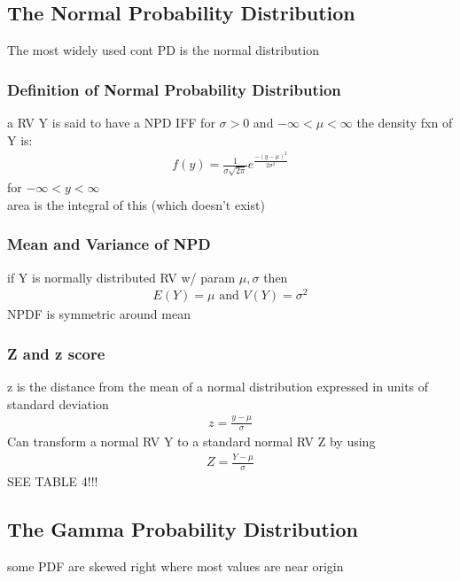\documentclass[12pt]{article}
\begin{document}
\subsection{The Normal Probability Distribution}
    The most widely used cont PD is the normal distribution
    \subsubsection{Definition of Normal Probability Distribution}
        a RV Y is said to have a NPD IFF for $ \sigma >0 $ and
        $ -\infty < \mu < \infty  $ the density fxn of Y is:
        \begin{align*}
            f(y) = \frac{1}{\sigma \sqrt{2\pi } }
            e^{\frac{-(y-\mu)^2}{2\sigma ^2 }}
        \end{align*}
        for $ -\infty < y < \infty  $\\
        area is the integral of this (which doesn't exist)
    \subsubsection{Mean and Variance of NPD}
        if Y is normally distributed RV w/ param $ \mu, \sigma  $ then
        \begin{align*}
            E(Y) = \mu \text{ and } V(Y) = \sigma ^2 
        \end{align*}
        NPDF is symmetric around mean
    \subsubsection{Z and z score}
        z is the distance from the mean of a normal distribution
        expressed in units of standard deviation
        \begin{align*}
            z = \frac{y-\mu }{\sigma }
        \end{align*}
        Can transform a normal RV Y to a standard normal RV Z by using
        \begin{align*}
            Z = \frac{Y-\mu }{\sigma }
        \end{align*}
        SEE TABLE 4!!!
\subsection{The Gamma Probability Distribution}
    some PDF are skewed right where most values are near origin
\end{document}
